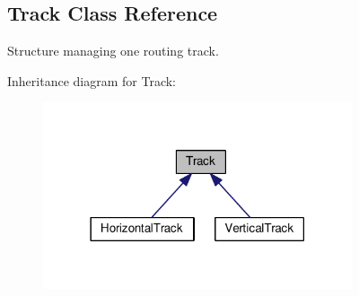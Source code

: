 \hypertarget{classKite_1_1Track}{}\subsection{Track Class Reference}
\label{classKite_1_1Track}


Structure managing one routing track.  




Inheritance diagram for Track\+:\nopagebreak
\begin{figure}[H]
\begin{center}
\leavevmode
\includegraphics[width=258pt]{classKite_1_1Track__inherit__graph}
\end{center}
\end{figure}
